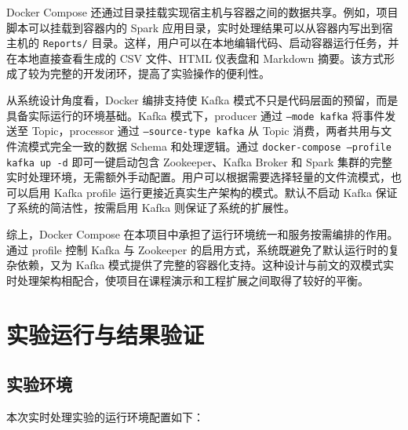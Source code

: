 \documentclass[12pt,hyperref,a4paper,UTF8]{ctexart}
\begin{document}
Docker Compose 还通过目录挂载实现宿主机与容器之间的数据共享。例如，项目脚本可以挂载到容器内的 Spark 应用目录，实时处理结果可以从容器内写出到宿主机的 \texttt{Reports/} 目录。这样，用户可以在本地编辑代码、启动容器运行任务，并在本地直接查看生成的 CSV 文件、HTML 仪表盘和 Markdown 摘要。该方式形成了较为完整的开发闭环，提高了实验操作的便利性。

从系统设计角度看，Docker 编排支持使 Kafka 模式不只是代码层面的预留，而是具备实际运行的环境基础。Kafka 模式下，producer 通过 \texttt{--mode kafka} 将事件发送至 Topic，processor 通过 \texttt{--source-type kafka} 从 Topic 消费，两者共用与文件流模式完全一致的数据 Schema 和处理逻辑。通过 \texttt{docker-compose --profile kafka up -d} 即可一键启动包含 Zookeeper、Kafka Broker 和 Spark 集群的完整实时处理环境，无需额外手动配置。用户可以根据需要选择轻量的文件流模式，也可以启用 Kafka profile 运行更接近真实生产架构的模式。默认不启动 Kafka 保证了系统的简洁性，按需启用 Kafka 则保证了系统的扩展性。

综上，Docker Compose 在本项目中承担了运行环境统一和服务按需编排的作用。通过 profile 控制 Kafka 与 Zookeeper 的启用方式，系统既避免了默认运行时的复杂依赖，又为 Kafka 模式提供了完整的容器化支持。这种设计与前文的双模式实时处理架构相配合，使项目在课程演示和工程扩展之间取得了较好的平衡。

\section{实验运行与结果验证}

\subsection{实验环境}

本次实时处理实验的运行环境配置如下：
\end{document}
